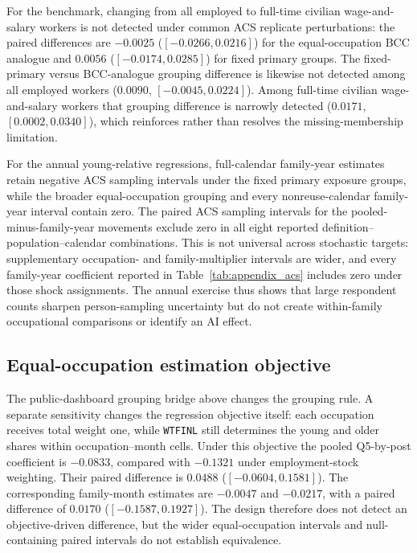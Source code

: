 

For the benchmark, changing from all employed to full-time civilian
wage-and-salary workers is not detected under common ACS replicate
perturbations: the paired differences are $-0.0025$
($[-0.0266,0.0216]$) for the equal-occupation BCC analogue and $0.0056$
($[-0.0174,0.0285]$) for fixed primary groups.  The fixed-primary versus BCC-analogue
grouping difference is likewise not detected among all employed workers
($0.0090$, $[-0.0045,0.0224]$).  Among full-time civilian wage-and-salary
workers that grouping difference is narrowly detected ($0.0171$,
$[0.0002,0.0340]$), which reinforces rather than resolves the missing-membership
limitation.

For the annual young-relative regressions, full-calendar family-year estimates
retain negative ACS sampling intervals under the fixed primary exposure groups,
while the broader equal-occupation grouping and every nonreuse-calendar
family-year interval contain zero.  The paired ACS sampling intervals for the
pooled-minus-family-year movements exclude zero in all eight reported
definition--population--calendar combinations.  This is not universal across
stochastic targets: supplementary occupation- and family-multiplier intervals
are wider, and every family-year coefficient reported in
Table~\ref{tab:appendix_acs} includes zero under those shock assignments.  The
annual exercise thus shows that large respondent counts sharpen person-sampling
uncertainty but do not create within-family occupational comparisons or
identify an AI effect.

\subsection{Equal-occupation estimation objective}

The public-dashboard grouping bridge above changes the grouping rule.  A separate sensitivity changes the regression objective itself: each occupation receives total weight one, while \texttt{WTFINL} still determines the young and older shares within occupation--month cells.  Under this objective the pooled Q5-by-post coefficient is $-0.0833$, compared with $-0.1321$ under employment-stock weighting.  Their paired difference is $0.0488$ ($[-0.0604,0.1581]$).  The corresponding family-month estimates are $-0.0047$ and $-0.0217$, with a paired difference of $0.0170$ ($[-0.1587,0.1927]$).  The design therefore does not detect an objective-driven difference, but the wider equal-occupation intervals and null-containing paired intervals do not establish equivalence.

